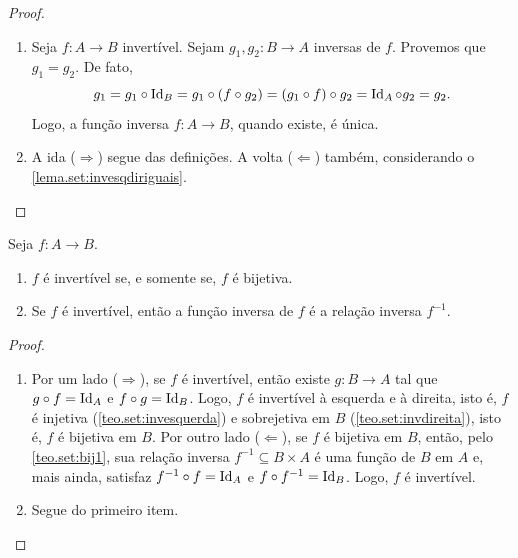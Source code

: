 \begin{proof}
    \leavevmode
        \begin{enumerate}[leftmargin=*, align=left, label=\textbf{(\alph*)}]
            \item Seja $f : A \to B$ invertível. Sejam $g_1, g_2 : B \to A$ inversas de $f$. Provemos que $g_1 = g_2$. De fato,
                \[
                    g_1 = g_1 \circ \operatorname{Id}_B = g_1 \circ (f \circ g_2) = (g_1 \circ f) \circ g_2 = \operatorname{Id}_A \circ g_2 = g_2.    
                \]
            Logo, a função inversa $f : A \to B$, quando existe, é única. \blackproof
            \item A ida ($\Rightarrow$) segue das definições. A volta ($\Leftarrow$) também, considerando o \cref{lema.set:invesqdiriguais}. \blackproof 
        \end{enumerate}
\end{proof}

\begin{theorem} \label{teo.set:bij2}
    Seja $f: A \to B$.
        \begin{enumerate}[leftmargin=*, align=left, label=\textbf{(\alph*)}]
            \item $f$ é invertível se, e somente se, $f$ é bijetiva.
            \item Se $f$ é invertível, então a função inversa de $f$ é a relação inversa $f^{-1}$.
        \end{enumerate}
\end{theorem}

\begin{proof}
    \leavevmode
        \begin{enumerate}[leftmargin=*, align=left, label=\textbf{(\alph*)}]
            \item Por um lado ($\Rightarrow$), se $f$ é invertível, então existe $g: B \to A$ tal que $g \circ f = \operatorname{Id}_A$ e $f \circ g = \operatorname{Id}_B$. Logo, $f$ é invertível à esquerda e à direita, isto é, $f$ é injetiva (\cref{teo.set:invesquerda}) e sobrejetiva em $B$ (\cref{teo.set:invdireita}), isto é, $f$ é bijetiva em $B$. Por outro lado ($\Leftarrow$), se $f$ é bijetiva em $B$, então, pelo \cref{teo.set:bij1}, sua relação inversa $f^{-1} \subseteq B \times A$ é uma função de $B$ em $A$ e, mais ainda, satisfaz $f^{-1} \circ f = \operatorname{Id}_{A}$ e $f \circ f^{-1} = \operatorname{Id}_{B}$. Logo, $f$ é invertível. \blackproof   
            \item Segue do primeiro item. \blackproof
        \end{enumerate}
\end{proof}


